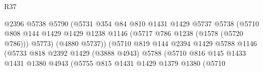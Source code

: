 \begin{lexlean}{R37}
\begin{coremodule}
                                            @2396
                                            @5738
                                            @5790
                                            (@5731
                                              @354
                                              @84
                                              @810
                                              @1431
                                              @1429
                                              @5737
                                              @5738
                                              (@5710
                                                @808
                                                @144
                                                @1429
                                                @1429
                                                @1238
                                                @1146
                                                (@5717 @786 @1238 (@1578 (@5720 @786)))
                                                @5773)
                                              (@4880 @5737))
                                            (@5710
                                              @819
                                              @144
                                              @2394
                                              @1429
                                              @5788
                                              @1146
                                              (@5733
                                                @818
                                                @2392
                                                @1429
                                                (@3888 @4943)
                                                @5788
                                                (@5710
                                                  @816
                                                  @145
                                                  @1433
                                                  @1431
                                                  @1380
                                                  @4943
                                                  (@5755
                                                    @815
                                                    @1431
                                                    @1429
                                                    @1379
                                                    @1380
                                                    (@5710

\end{coremodule}
\end{lexlean}

